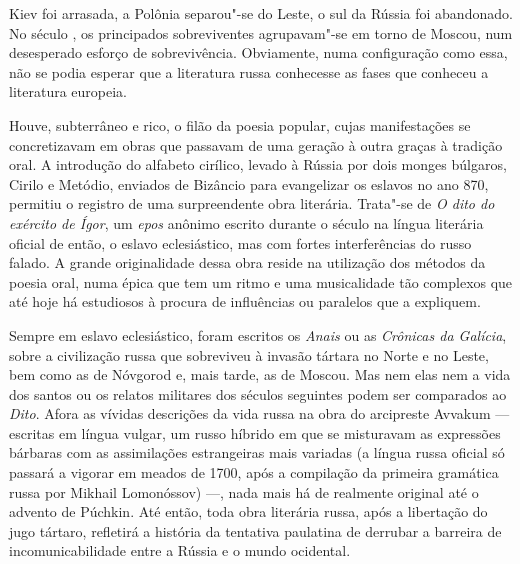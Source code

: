 Kiev foi arrasada, a Polônia separou"-se do Leste, o sul da Rússia foi
abando­nado. No século , os principados sobreviventes agrupavam"-se em
torno de Moscou, num desesperado esforço de sobrevivência. Obviamente,
numa con­figuração como essa, não se podia esperar que a literatura
russa conhecesse as fases que conheceu a literatura europeia.

Houve, subterrâneo e rico, o filão da poesia popular, cujas
manifestações se concretizavam em obras que passavam de uma geração à
outra graças à tradi­ção oral. A introdução do alfabeto cirílico,
levado à Rússia por dois monges búlgaros, Cirilo e Metódio, enviados de
Bizâncio para evangelizar os eslavos no ano 870, permitiu o registro de
uma surpreendente obra literária. Trata"-se de \emph{O dito do exército de
Ígor}, um \emph{epos} anônimo escrito durante o século  na língua literária
oficial de então, o eslavo eclesiástico, mas com fortes interfe­rências
do russo falado. A grande originalidade dessa obra reside na utilização dos
métodos da poesia oral, numa épica que tem um ritmo e uma musicalidade
tão complexos que até hoje há estudiosos à procura de influências ou
paralelos que a expliquem.

Sempre em eslavo eclesiástico, foram escritos os \emph{Anais} ou as \emph{Crônicas da
Galícia}, sobre a civilização russa que sobreviveu à invasão tártara no Norte e
no Leste, bem como as de Nóvgorod e, mais tarde, as de Moscou. Mas nem
elas nem a vida dos santos ou os relatos militares dos séculos seguintes
podem ser comparados ao \emph{Dito}. Afora as vívidas descrições da vida russa
na obra do arcipreste Avvakum --- escritas em língua vulgar, um russo
híbrido em que se misturavam as expres­sões bárbaras com as assimilações
estrangeiras mais variadas (a língua russa oficial só passará a vigorar
em meados de 1700, após a compilação da primeira gramática russa por Mikhail Lomonóssov) ---, nada mais há de realmente original até o advento de Púchkin. Até então, toda
obra literária russa, após a libertação do jugo tártaro, refletirá a
história da tentativa paulatina de derrubar a barreira de
incomunicabilidade entre a Rússia e o mundo ocidental.

